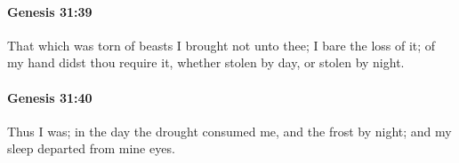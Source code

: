 		\paragraph{Genesis 31:39} %
			\label{GENESIS-31-39}

			That which was torn of beasts I brought not unto thee; I bare the loss of it; of my hand didst thou require it, whether stolen by day, or stolen by night.


		\paragraph{Genesis 31:40} %
			\label{GENESIS-31-40}

			Thus I was; in the day the drought consumed me, and the frost by night; and my sleep departed from mine eyes.


